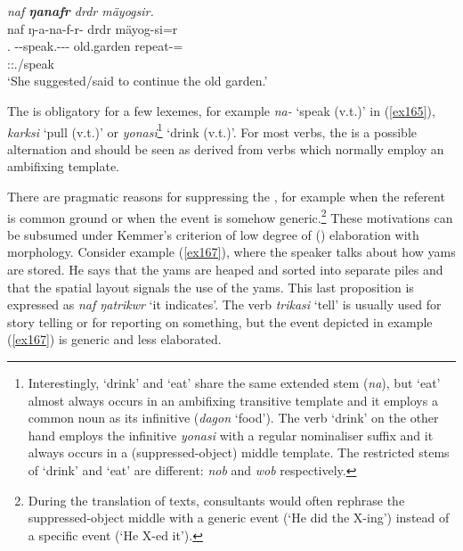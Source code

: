 \begin{exe}
	\ex \emph{naf \textbf{ŋanafr} drdr mäyogsir.}\\
	\glll naf ŋ-a-na-f-r-\Zero{} drdr mäyog-si=r\\
	\Tsg.\Erg{} \M-\Vc-speak.\Rs-\Ndu-\Lk-\Stsg{} old.garden repeat-\Nmlz=\Purp\\
	{} \footnotesize{\Stsg:\Sbj:\Nonpast.\Ipfv/speak} {} {}\\
	\trans `She suggested/said to continue the old garden.'
	\label{ex165}
\end{exe}

The   is obligatory for a few lexemes, for example \emph{na-} `speak (v.t.)' in (\ref{ex165}), \emph{karksi} `pull (v.t.)' or \emph{yonasi}\footnote{Interestingly, `drink' and `eat' share the same extended stem (\emph{na}), but `eat' almost always occurs in an ambifixing transitive template and it employs a common noun as its infinitive (\emph{dagon} `food'). The verb `drink' on the other hand employs the infinitive \emph{yonasi} with a regular nominaliser suffix and it always occurs in a (suppressed-object) middle template. The restricted stems of `drink' and `eat' are different: \emph{nob} and \emph{wob} respectively.} `drink (v.t.)'. For most verbs, the   is a possible alternation and should be seen as derived from verbs which normally employ an ambifixing  template.%

There are pragmatic reasons for suppressing the , for example when the referent is common ground or when the event is somehow generic.\footnote{During the translation of texts, consultants would often rephrase the suppressed-object middle with a generic event (`He did the X-ing') instead of a specific event (`He X-ed it').} These motivations can be subsumed under Kemmer's criterion of low degree of () elaboration with  morphology. Consider example (\ref{ex167}), where the speaker talks about how yams are stored. He says that the yams are heaped and sorted into separate piles and that the spatial layout signals the use of the yams. This last proposition is expressed as \emph{naf ŋatrikwr} `it indicates'. The verb \emph{trikasi} `tell' is usually used for story telling or for reporting on something, but the event depicted in example (\ref{ex167}) is generic and less elaborated.

